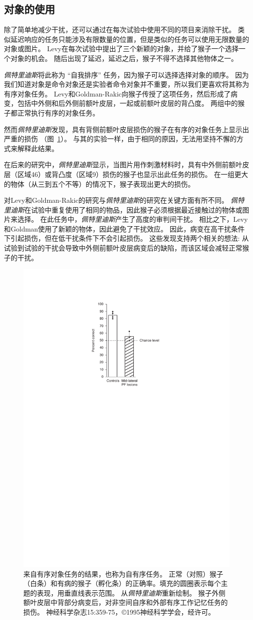 \subsection{对象的使用}

除了简单地减少干扰，还可以通过在每次试验中使用不同的项目来消除干扰。
类似延迟响应的任务只能涉及有限数量的位置，但是类似的任务可以使用无限数量的对象或图片。
Levy\cite{levy1999association}在每次试验中提出了三个新颖的对象，并给了猴子一个选择一个对象的机会。
随后出现了延迟，延迟之后，猴子不得不选择其他物体之一。


\textit{佩特里迪斯}\cite{petrides1995impairments}将此称为 “自我排序” 任务，因为猴子可以选择选择对象的顺序。
因为我们知道对象是命令对象还是实验者命令对象并不重要，所以我们更喜欢将其称为有序对象任务。
Levy和Goldman-Rakic向猴子传授了这项任务，然后形成了病变，包括中外侧和后外侧前额叶皮层，一起或前额叶皮层的背凸度。
两组中的猴子都正常执行有序的对象任务。


然而\textit{佩特里迪斯}\cite{petrides1995impairments}发现，具有背侧前额叶皮层损伤的猴子在有序的对象任务上显示出严重的损伤 （图~\ref{fig:6_4}）。
与其的实验一样，由于相同的原因，无法用坚持不懈的方式来解释此结果。


在后来的研究中，\textit{佩特里迪斯}\cite{petrides2000dissociable}显示，当图片用作刺激材料时，具有中外侧前额叶皮层（区域46）或背凸度（区域9）损伤的猴子也显示出此任务的损伤。
在一组更大的物体（从三到五个不等）的情况下，猴子表现出更大的损伤。


对Levy和Goldman-Rakic的研究与\textit{佩特里迪斯}的研究在关键方面有所不同。
\textit{佩特里迪斯}在试验中重复使用了相同的物品，因此猴子必须根据最近接触过的物体或图片来选择。
在此任务中，\textit{佩特里迪斯}产生了高度的审判间干扰。
相比之下，Levy和Goldman使用了新颖的物体，因此避免了干扰效应。
因此，病变在高干扰条件下引起损伤，但在低干扰条件下不会引起损伤。
这些发现支持两个相关的想法: 从试验到试验的干扰会导致中外侧前额叶皮层病变后的缺陷，而该区域会减轻正常猴子的干扰。


\begin{figure}
	\centering
	\includegraphics[width=0.3\linewidth]{chap6/6_4}
	\caption{来自有序对象任务的结果，也称为自有序任务。
		正常（对照）猴子（白条）和有病的猴子（孵化条）的正确率。填充的圆圈表示每个主题的表现，用垂直线表示范围。
		从\textit{佩特里迪斯}重新绘制。
		猴子外侧额叶皮层中背部分病变后，对非空间自序和外部有序工作记忆任务的损伤。
		神经科学杂志15:359-75，©1995神经科学学会，经许可。}
	\label{fig:6_4}
\end{figure}




